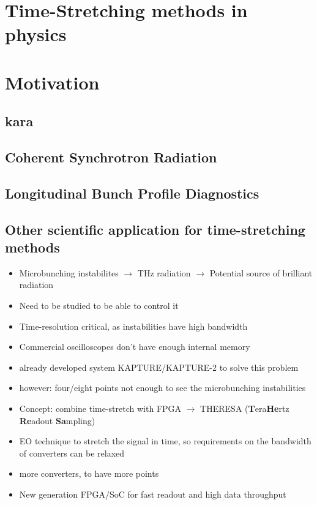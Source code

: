 \section{Time-Stretching methods in physics}
\section{Motivation}
	\subsection{\gls{kara}}
	\subsection{Coherent Synchrotron Radiation}
	\subsection{Longitudinal Bunch Profile Diagnostics}
	\subsection{Other scientific application for time-stretching methods}


\begin{itemize}
	\item Microbunching instabilites $\rightarrow$ THz radiation $\rightarrow$ Potential source of brilliant radiation
	\item Need to be studied to be able to control it
	\item Time-resolution critical, as instabilities have high bandwidth
	\item Commercial oscilloscopes don't have enough internal memory
	\item already developed system KAPTURE/KAPTURE-2 to solve this problem
	\item however: four/eight points not enough to see the microbunching instabilities
	\item Concept: combine time-stretch with FPGA $\rightarrow$ THERESA (\textbf{T}era\textbf{He}rtz \textbf{Re}adout \textbf{Sa}mpling)
	\item EO technique to stretch the signal in time, so requirements on the bandwidth of converters can be relaxed
	\item more converters, to have more points
	\item New generation FPGA/SoC for fast readout and high data throughput
\end{itemize}

